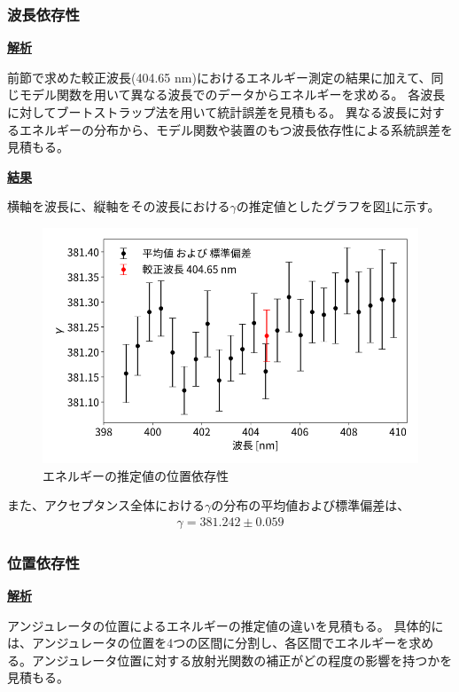 \documentclass[a4paper,11pt,uplatex]{jsbook}
\begin{document}
\subsubsection{波長依存性}
\noindent \textbf{\underline{解析}}\par
前節で求めた較正波長(404.65 nm)におけるエネルギー測定の結果に加えて、同じモデル関数を用いて異なる波長でのデータからエネルギーを求める。
各波長に対してブートストラップ法を用いて統計誤差を見積もる。
異なる波長に対するエネルギーの分布から、モデル関数や装置のもつ波長依存性による系統誤差を見積もる。

\noindent \textbf{\underline{結果}}\par
横軸を波長に、縦軸をその波長における$\gamma$の推定値としたグラフを図\ref{wldep}に示す。
\begin{figure}[h]
  \centering
  \includegraphics[width=0.8\linewidth]{image/4-wldep.png}
  \caption{エネルギーの推定値の位置依存性}\label{wldep}
\end{figure}

また、アクセプタンス全体における$\gamma$の分布の平均値および標準偏差は、
\begin{eqnarray}
  \gamma = 381.242 \pm 0.059
\end{eqnarray}

\subsubsection{位置依存性}
\noindent \textbf{\underline{解析}}\par
アンジュレータの位置によるエネルギーの推定値の違いを見積もる。
具体的には、アンジュレータの位置を4つの区間に分割し、各区間でエネルギーを求める。アンジュレータ位置に対する放射光関数の補正がどの程度の影響を持つかを見積もる。
\end{document}
